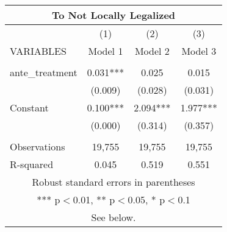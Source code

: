 \begin{tabular}{lccc}
\multicolumn{4}{c}{To Not Locally Legalized} \\ \hline
 & (1) & (2) & (3) \\
VARIABLES & Model 1 & Model 2 & Model 3 \\ \hline
 &  &  &  \\
ante\_treatment & 0.031*** & 0.025 & 0.015 \\
 & (0.009) & (0.028) & (0.031) \\
Constant & 0.100*** & 2.094*** & 1.977*** \\
 & (0.000) & (0.314) & (0.357) \\
 &  &  &  \\
Observations & 19,755 & 19,755 & 19,755 \\
 R-squared & 0.045 & 0.519 & 0.551 \\ \hline
\multicolumn{4}{c}{ Robust standard errors in parentheses} \\
\multicolumn{4}{c}{ *** p$<$0.01, ** p$<$0.05, * p$<$0.1} \\
\multicolumn{4}{c}{ See below.} \\
\end{tabular}
